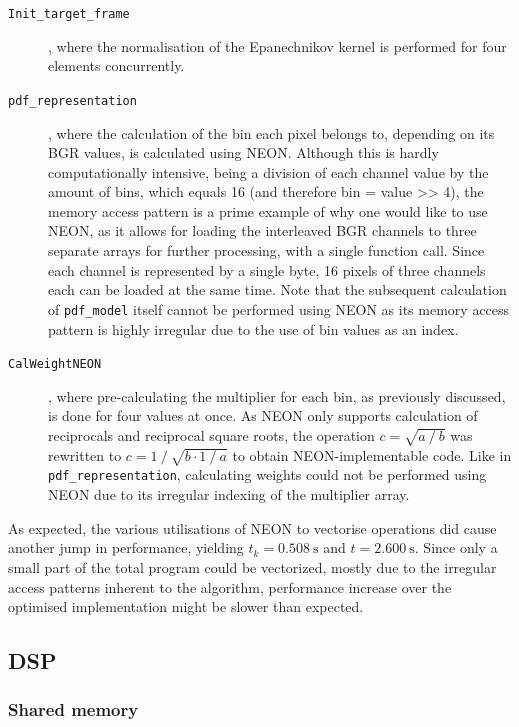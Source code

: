 \documentclass[final]{article}
\begin{document}
\begin{description}
    \item[\texttt{Init\_target\_frame}], where the normalisation of the Epanechnikov kernel is performed for four elements concurrently.

    \item[\texttt{pdf\_representation}], where the calculation of the bin each pixel belongs to, depending on its BGR values, is calculated using NEON. Although this is hardly computationally intensive, being a division of each channel value by the amount of bins, which equals 16 (and therefore bin = value >> 4), the memory access pattern is a prime example of why one would like to use NEON, as it allows for loading the interleaved BGR channels to three separate arrays for further processing, with a single function call. Since each channel is represented by a single byte, 16 pixels of three channels each can be loaded at the same time.
    Note that the subsequent calculation of \texttt{pdf\_model} itself cannot be performed using NEON as its memory access pattern is highly irregular due to the use of bin values as an index.

    \item[\texttt{CalWeightNEON}], where pre-calculating the multiplier for each bin, as previously discussed, is done for four values at once. As NEON only supports calculation of reciprocals and reciprocal square roots, the operation $c = \sqrt{a \mathbin{/} b}$ was rewritten to $c = 1 \mathbin{/} \sqrt{b \cdot 1 \mathbin{/} a}$ to obtain NEON-implementable code. Like in \texttt{pdf\_representation}, calculating weights could not be performed using NEON due to its irregular indexing of the multiplier array.
\end{description}

As expected, the various utilisations of NEON to vectorise operations did cause another jump in performance, yielding $t_k = \SI{0.508}{\second}$ and $t = \SI{2.600}{\second}$. Since only a small part of the total program could be vectorized, mostly due to the irregular access patterns inherent to the algorithm, performance increase over the optimised implementation might be slower than expected.


\subsection{DSP}

\subsubsection{Shared memory}
\end{document}
